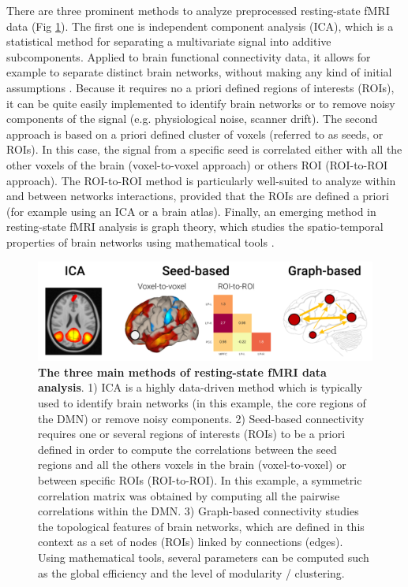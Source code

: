 There are three prominent methods to analyze preprocessed resting-state fMRI data (Fig \ref{fig:methods:ana-methods}). The first one is independent component analysis (ICA), which is a statistical method for separating a multivariate signal into additive subcomponents. Applied to brain functional connectivity data, it allows for example to separate distinct brain networks, without making any kind of initial assumptions \citep{beckmann_investigations_2005}. Because it requires no a priori defined regions of interests (ROIs), it can be quite easily implemented to identify brain networks or to remove noisy components of the signal (e.g. physiological noise, scanner drift). The second approach is based on a priori defined cluster of voxels (referred to as seeds, or ROIs). In this case, the signal from a specific seed is correlated either with all the other voxels of the brain (voxel-to-voxel approach) or others ROI (ROI-to-ROI approach). The ROI-to-ROI method is particularly well-suited to analyze within and between networks interactions, provided that the ROIs are defined a priori (for example using an ICA or a brain atlas). Finally, an emerging method in resting-state fMRI analysis is graph theory, which studies the spatio-temporal properties of brain networks using mathematical tools \citep{bullmore_complex_2009}.

\begin{figure}[htb]
	\includegraphics[width=\textwidth]{Fig/Methods/fMRI_seed_graph_ica/fMRI_seed_graph_ica.png}
	\caption[The three main methods of resting-state fMRI data analysis]{\textbf{The three main methods of resting-state fMRI data analysis}. 1) ICA is a highly data-driven method which is typically used to identify brain networks (in this example, the core regions of the DMN) or remove noisy components. 2) Seed-based connectivity requires one or several regions of interests (ROIs) to be a priori defined in order to compute the correlations between the seed regions and all the others voxels in the brain (voxel-to-voxel) or between specific ROIs (ROI-to-ROI). In this example, a symmetric correlation matrix was obtained by computing all the pairwise correlations within the DMN. 3) Graph-based connectivity studies the topological features of brain networks, which are defined in this context as a set of nodes (ROIs) linked by connections (edges). Using mathematical tools, several parameters can be computed such as the global efficiency and the level of modularity / clustering.}
	\label{fig:methods:ana-methods}
\end{figure}

